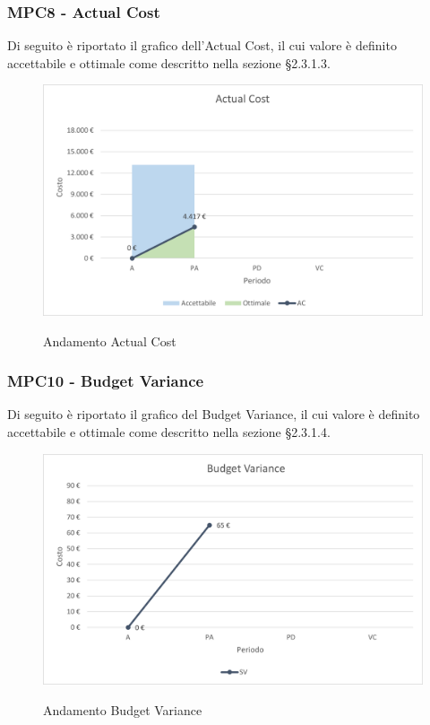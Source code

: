 \subsubsection{MPC8 - Actual Cost}
Di seguito è riportato il grafico dell'Actual Cost, il cui valore è definito accettabile e ottimale come descritto nella sezione §2.3.1.3.\\

\begin{figure}[H]
\centering
\includegraphics[scale=0.78]{res/ResocontoAttivitaDiVerifica/res/metriche/grafici/img/actualCost.png}\\
\caption{Andamento Actual Cost}
\end{figure}

\subsubsection{MPC10 - Budget Variance}
Di seguito è riportato il grafico del Budget Variance, il cui valore è definito accettabile e ottimale come descritto nella sezione §2.3.1.4.\\

\begin{figure}[H]
\centering
\includegraphics[scale=0.78]{res/ResocontoAttivitaDiVerifica/res/metriche/grafici/img/budgetVariance.png}\\
\caption{Andamento Budget Variance}
\end{figure}


